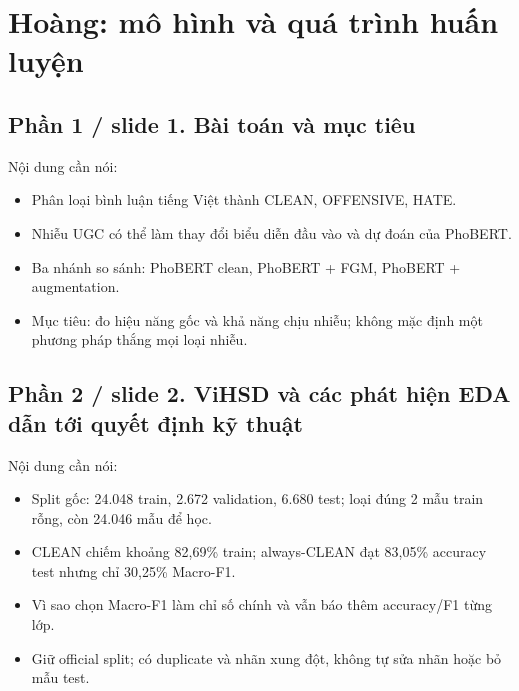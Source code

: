 \documentclass[11pt,a4paper]{article}
\begin{document}
\FloatBarrier\section{Hoàng: mô hình và quá trình huấn luyện}

\subsection*{Phần 1 / slide 1. Bài toán và mục tiêu}

Nội dung cần nói:


\begin{itemize}

\item Phân loại bình luận tiếng Việt thành CLEAN, OFFENSIVE, HATE.

\item Nhiễu UGC có thể làm thay đổi biểu diễn đầu vào và dự đoán của PhoBERT.

\item Ba nhánh so sánh: PhoBERT clean, PhoBERT + FGM, PhoBERT + augmentation.

\item Mục tiêu: đo hiệu năng gốc và khả năng chịu nhiễu; không mặc định một phương pháp thắng mọi loại nhiễu.

\end{itemize}

\subsection*{Phần 2 / slide 2. ViHSD và các phát hiện EDA dẫn tới quyết định kỹ thuật}

Nội dung cần nói:


\begin{itemize}

\item Split gốc: 24.048 train, 2.672 validation, 6.680 test; loại đúng 2 mẫu train rỗng, còn 24.046 mẫu để học.

\item CLEAN chiếm khoảng 82,69\% train; always-CLEAN đạt 83,05\% accuracy test nhưng chỉ 30,25\% Macro-F1.

\item Vì sao chọn Macro-F1 làm chỉ số chính và vẫn báo thêm accuracy/F1 từng lớp.

\item Giữ official split; có duplicate và nhãn xung đột, không tự sửa nhãn hoặc bỏ mẫu test.

\end{itemize}
\end{document}

